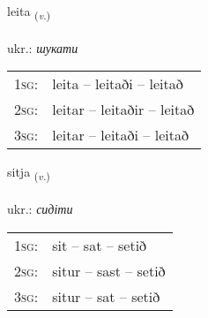 \documentclass[frontgrid, backgrid]{flacards}\usepackage[]{graphicx}\usepackage[]{xcolor}
\begin{document}
\renewcommand{\flhead}{\vskip5pt \fboxsep=0pt {\small\bfseries\footnotesize Sagnorð | дієслово}}
\renewcommand{\fcfoot}{\vskip5pt \fboxsep=0pt \hspace{2pt}{\small\bfseries\footnotesize 1K}}

\renewcommand{\blhead}{\vskip5pt {\small\bfseries\footnotesize Sagnorð | дієслово }}
\renewcommand{\bcfoot}{\vskip5pt \hspace{2pt}{\small\bfseries\footnotesize 1K}}


{leita \small{\textsubscript{(\textit{v.})}} \\[1ex] %
\textphonetic{[leiːta]} \\
ukr.: \emph{шукати} \\  [2ex]
\renewcommand*{\arraystretch}{0.8}
\begin{tabular}{p{1cm}l}
\textsc{1sg}: & leita -- leitaði -- leitað \\ 
\textsc{2sg}: & leitar -- leitaðir -- leitað \\ 
\textsc{3sg}: & leitar -- leitaði -- leitað \\ 
\end{tabular}
}

\renewcommand{\flhead}{\vskip5pt \fboxsep=0pt {\small\bfseries\footnotesize Sagnorð | дієслово}}
\renewcommand{\fcfoot}{\vskip5pt \fboxsep=0pt \hspace{2pt}{\small\bfseries\footnotesize 1K}}

\renewcommand{\blhead}{\vskip5pt {\small\bfseries\footnotesize Sagnorð | дієслово }}
\renewcommand{\bcfoot}{\vskip5pt \hspace{2pt}{\small\bfseries\footnotesize 1K}}


{sitja \small{\textsubscript{(\textit{v.})}} \\[1ex] %
\textphonetic{[sɪːtja]} \\
ukr.: \emph{сидіти} \\  [2ex]
\renewcommand*{\arraystretch}{0.8}
\begin{tabular}{p{1cm}l}
\textsc{1sg}: & sit -- sat -- setið \\ 
\textsc{2sg}: & situr -- sast -- setið \\ 
\textsc{3sg}: & situr -- sat -- setið \\ 
\end{tabular}
}
\end{document}
